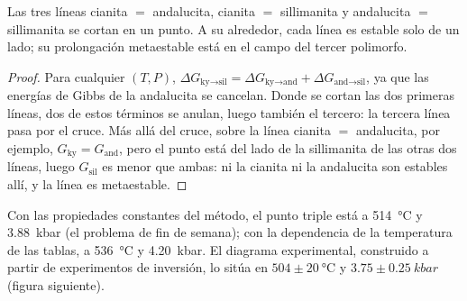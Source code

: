 \begin{proposition}\label{prop:b2:metamorphic-facies:triple}
Las tres líneas cianita $=$ andalucita, cianita $=$ sillimanita y andalucita $=$
sillimanita se cortan en un punto. A su alrededor, cada línea es estable solo de un lado; su
prolongación metaestable está en el campo del tercer polimorfo.
\end{proposition}

\begin{proof}
Para cualquier $(T, P)$, $\Delta G_{\text{ky}\to\text{sil}} = \Delta G_{\text{ky}\to\text{and}} +
\Delta G_{\text{and}\to\text{sil}}$, ya que las energías de Gibbs de la andalucita se cancelan. Donde
se cortan las dos primeras líneas, dos de estos términos se anulan, luego también el tercero: la tercera
línea pasa por el cruce. Más allá del cruce, sobre la línea cianita $=$ andalucita,
por ejemplo, $G_{\text{ky}} = G_{\text{and}}$, pero el punto está del lado de la sillimanita de las
otras dos líneas, luego $G_{\text{sil}}$ es menor que ambas: ni la cianita ni la andalucita
son estables allí, y la línea es metaestable.
\end{proof}

Con las propiedades constantes del método, el punto triple está a
\qty{514}{\celsius} y \qty{3.88}{kbar} (el problema de fin de semana); con la dependencia
de la temperatura de las tablas, a \qty{536}{\celsius} y \qty{4.20}{kbar}. El diagrama
experimental, construido a partir de experimentos de inversión, lo sitúa en $504 \pm \qty{20}{\celsius}$ y
$3.75 \pm \qty{0.25}{kbar}$ (figura siguiente).

